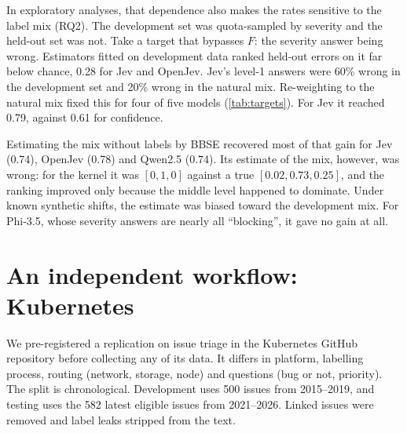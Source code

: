 In exploratory analyses, that dependence also makes the rates sensitive
to the label mix (RQ2). The development
set was quota-sampled by severity and the held-out set was not. Take a target that bypasses $F$: the severity answer
being wrong. Estimators fitted on development data ranked held-out errors
on it far below chance, 0.28 for Jev and OpenJev. Jev's level-1 answers were 60\% wrong in the
development set and 20\% wrong in the natural mix. Re-weighting to the
natural mix fixed this for four of five models (\cref{tab:targets}). For Jev
it reached 0.79, against 0.61 for confidence.

\begin{coltable}
\centering
\caption{Exploratory: held-out AUROC of the decision estimator on two targets that bypass $F$. It is fitted on the quota-sampled
development bugs (``dev fit'') or re-weighted to the natural label mix,
and compared with final-step confidence. Bold: re-weighted estimator above confidence.}
\label{tab:targets}
\small
\resizebox{\linewidth}{!}{}
\end{coltable}
 Estimating
the mix without labels by BBSE \citep{lipton2018bbse} recovered most of
that gain for Jev (0.74), OpenJev (0.78) and Qwen2.5 (0.74). Its estimate of the mix, however, was wrong: for the kernel it was
$[0, 1, 0]$ against a true $[0.02, 0.73, 0.25]$, and the ranking improved
only because the middle level happened to dominate. Under known synthetic shifts, the estimate was biased toward the
development mix. For Phi-3.5, whose severity answers are nearly all ``blocking'', it gave
no gain at all.

\section{An independent workflow: Kubernetes}
\label{sec:k8s}

We pre-registered a replication on issue triage in the Kubernetes GitHub
repository before collecting any of its data. It differs in platform,
labelling process, routing (network, storage, node) and questions (bug
or not, priority). The split is chronological. Development uses 500 issues from 2015--2019,
and testing uses the 582 latest eligible issues from 2021--2026. Linked
issues were removed and label leaks stripped from the text.

